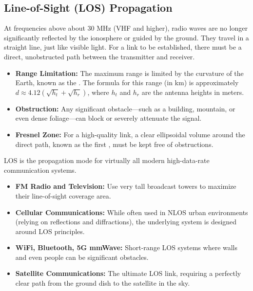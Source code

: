 \subsection{Line-of-Sight (LOS) Propagation}

At frequencies above about 30 MHz (VHF and higher), radio waves are no longer significantly reflected by the ionosphere or guided by the ground. They travel in a straight line, just like visible light. For a link to be established, there must be a direct, unobstructed path between the transmitter and receiver.

\begin{itemize}
    \item \textbf{Range Limitation:} The maximum range is limited by the curvature of the Earth, known as the . The formula for this range (in km) is approximately $d \approx 4.12(\sqrt{h_t} + \sqrt{h_r})$, where $h_t$ and $h_r$ are the antenna heights in meters.
    \item \textbf{Obstruction:} Any significant obstacle—such as a building, mountain, or even dense foliage—can block or severely attenuate the signal.
    \item \textbf{Fresnel Zone:} For a high-quality link, a clear ellipsoidal volume around the direct path, known as the first , must be kept free of obstructions.
\end{itemize}

LOS is the propagation mode for virtually all modern high-data-rate communication systems.
\begin{itemize}
    \item \textbf{FM Radio and Television:} Use very tall broadcast towers to maximize their line-of-sight coverage area.
    \item \textbf{Cellular Communications:} While often used in NLOS urban environments (relying on reflections and diffractions), the underlying system is designed around LOS principles.
    \item \textbf{WiFi, Bluetooth, 5G mmWave:} Short-range LOS systems where walls and even people can be significant obstacles.
    \item \textbf{Satellite Communications:} The ultimate LOS link, requiring a perfectly clear path from the ground dish to the satellite in the sky.
\end{itemize}

